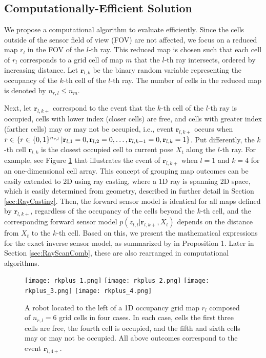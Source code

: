 \subsection{Computationally-Efficient Solution}

We propose a computational algorithm to evaluate  efficiently. 
Since the cells outside of the sensor field of view (FOV) are not affected, we focus on a reduced map $r_l$ in the FOV of the $l$-th ray. This reduced map is chosen such that each cell of $r_l$ corresponds to a grid cell of map $m$ that the $l$-th ray intersects, ordered by increasing distance. Let $\mathbf{r}_{l,k}$ be the binary random variable representing the occupancy of the $k$-th cell of the $l$-th ray. The number of cells in the reduced map is denoted by $n_{r,l}\leq n_m$.

Next, let $\mathbf{r}_{l,k+}$ correspond to the event that the $k$-th cell of the $l$-th ray is occupied, cells with lower index (closer cells) are free, and cells with greater index (farther cells) may or may not be occupied, i.e., event $\mathbf{r}_{l,k+}$ occurs when \\$r\in\left\{ r\in\{0,1\}^{{n_{r,l}}}\,|\mathbf{r}_{l,1}=0,\mathbf{r}_{l,2}=0,\ldots,\mathbf{r}_{l,k-1}=0,\mathbf{r}_{l,k}=1 \right\}$. Put differently, the $k$-th cell $\mathbf{r}_{l,k}$ is the closest occupied cell to current pose $X_t$ along the $l$-th ray. For example, see Figure \ref{fig:show_rkplus} that illustrates the event of $\mathbf{r}_{l,k+}$ when $l=1$ and $k=4$ for an one-dimensional cell array. This concept of grouping map outcomes can be easily extended to 2D using ray casting, where a 1D ray is spanning 2D space, which is easily determined from geometry, described in further detail in Section \ref{sec:RayCasting}. Then, the forward sensor model is identical for all maps defined by $\mathbf{r}_{l,k+}$, regardless of the occupancy of the cells beyond the $k$-th cell, and the corresponding forward sensor model $p(z_{t,l}|\mathbf{r}_{l,k+},X_{t})$ depends on the distance from $X_t$ to the $k$-th cell. Based on this, we present the mathematical expressions for the exact inverse sensor model, as summarized by  in Proposition 1. Later in Section \ref{sec:RayScanComb}, these are also rearranged in computational algorithms. 



\begin{figure}
  \centering
  \texttt{[image: rkplus\_1.png]}
    \centering
  \texttt{[image: rkplus\_2.png]}  
  \centering
  \texttt{[image: rkplus\_3.png]}
    \centering
  \texttt{[image: rkplus\_4.png]}
  \caption{A robot located to the left of a 1D occupancy grid map $r_l$ composed of $n_{r,l}=6$ grid cells in four cases. In each case, cells the first three cells are free, the fourth cell is occupied, and the fifth and sixth cells may or may not be occupied. All above outcomes correspond to the event $\mathbf{r}_{l,4+}$.}
  \label{fig:show_rkplus}
\end{figure}

